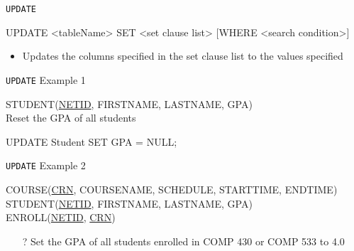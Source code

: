 \documentclass[aspectratio=169]{beamer}
\begin{document}
\begin{frame}[fragile]{\texttt{UPDATE}}

\begin{SQL}
UPDATE <tableName>
SET <set clause list>
[WHERE <search condition>]
\end{SQL}

\begin{itemize}
\item Updates the columns specified in the set clause list to the values specified
\end{itemize}
\end{frame}

\begin{frame}[fragile]{\texttt{UPDATE} Example 1}

STUDENT(\underline{NETID}, FIRSTNAME, LASTNAME, GPA)\\
\vspace{2em}
Reset the GPA of all students
\vspace{2em}

\begin{SQL}
UPDATE Student
   SET GPA = NULL;
\end{SQL}


\end{frame}

\begin{frame}[fragile]{\texttt{UPDATE} Example 2}

COURSE(\underline{CRN}, COURSENAME, SCHEDULE, STARTTIME, ENDTIME)\\
STUDENT(\underline{NETID}, FIRSTNAME, LASTNAME, GPA)\\
ENROLL(\underline{NETID}, \underline{CRN})\\
\vspace{2em}
\begin{itemize}
\item[?] Set the GPA of all students enrolled in COMP 430 or COMP 533 to 4.0
\end{itemize}
\end{frame}
\end{document}
